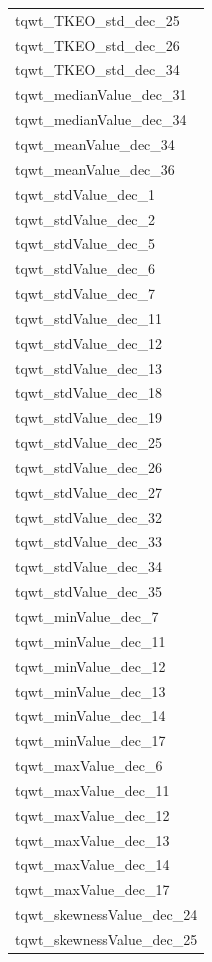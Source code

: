 \documentclass[
]{article}
\begin{document}
\begin{table}
\begin{tabular}{l}
\addlinespace
tqwt\_TKEO\_std\_dec\_25\\
tqwt\_TKEO\_std\_dec\_26\\
tqwt\_TKEO\_std\_dec\_34\\
tqwt\_medianValue\_dec\_31\\
tqwt\_medianValue\_dec\_34\\
\addlinespace
tqwt\_meanValue\_dec\_34\\
tqwt\_meanValue\_dec\_36\\
tqwt\_stdValue\_dec\_1\\
tqwt\_stdValue\_dec\_2\\
tqwt\_stdValue\_dec\_5\\
\addlinespace
tqwt\_stdValue\_dec\_6\\
tqwt\_stdValue\_dec\_7\\
tqwt\_stdValue\_dec\_11\\
tqwt\_stdValue\_dec\_12\\
tqwt\_stdValue\_dec\_13\\
\addlinespace
tqwt\_stdValue\_dec\_18\\
tqwt\_stdValue\_dec\_19\\
tqwt\_stdValue\_dec\_25\\
tqwt\_stdValue\_dec\_26\\
tqwt\_stdValue\_dec\_27\\
\addlinespace
tqwt\_stdValue\_dec\_32\\
tqwt\_stdValue\_dec\_33\\
tqwt\_stdValue\_dec\_34\\
tqwt\_stdValue\_dec\_35\\
tqwt\_minValue\_dec\_7\\
\addlinespace
tqwt\_minValue\_dec\_11\\
tqwt\_minValue\_dec\_12\\
tqwt\_minValue\_dec\_13\\
tqwt\_minValue\_dec\_14\\
tqwt\_minValue\_dec\_17\\
\addlinespace
tqwt\_maxValue\_dec\_6\\
tqwt\_maxValue\_dec\_11\\
tqwt\_maxValue\_dec\_12\\
tqwt\_maxValue\_dec\_13\\
tqwt\_maxValue\_dec\_14\\
\addlinespace
tqwt\_maxValue\_dec\_17\\
tqwt\_skewnessValue\_dec\_24\\
tqwt\_skewnessValue\_dec\_25\\

\end{tabular}
\end{table}
\end{document}
